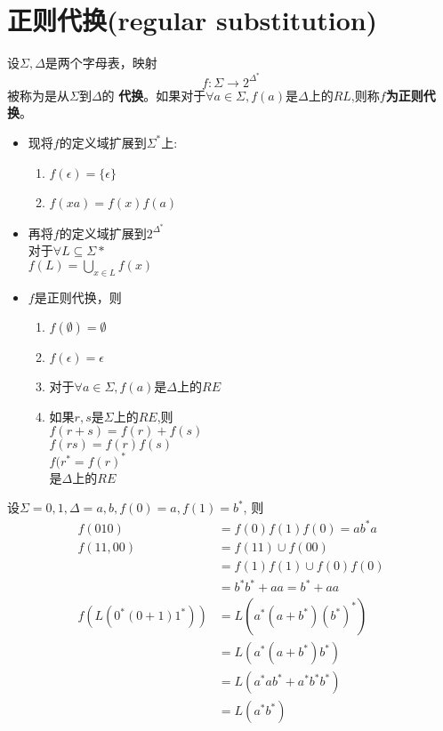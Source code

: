 \section{正则代换(regular substitution)}

设$\Sigma,\Delta$是两个字母表，映射
$$f:\Sigma \to 2^{\Delta^{\ast}}$$
被称为是从$\Sigma$到$\Delta$的
\textbf{代换}。如果对于$\forall a\in \Sigma,f(a)$是$\Delta$上的$RL$,则称\textbf{$f$为正则代换}。

\begin{itemize}
	\item 现将$f$的定义域扩展到$\Sigma^{\ast}$上:
	\begin{enumerate}
		\item $f(\epsilon) =\{\epsilon\}$
		\item $f(xa)=f(x)f(a)$
	\end{enumerate}
    \item 再将$f$的定义域扩展到$2^{\Delta^{\ast}}$\\
    对于$\forall L\subseteq \Sigma{\ast}$\\
    $f(L) = \bigcup\limits_{x\in L} f(x)$
    \item $f$是正则代换，则
    \begin{enumerate}
    	\item $f(\emptyset)=\emptyset$
    	\item $f(\epsilon)=\epsilon$
    	\item 对于$\forall a\in \Sigma,f(a)$是$\Delta$上的$RE$
    	\item 如果$r,s$是$\Sigma$上的$RE$,则\\
    	$f(r+s)=f(r)+f(s)$\\
    	$f(rs)=f(r)f(s)$\\
    	$f(r^{\ast}={f(r)}^{\ast}$\\
    	是$\Delta$上的$RE$
    \end{enumerate}
\end{itemize}

\begin{example}
	设$\Sigma={0,1},\Delta={a,b},f(0)=a,f(1)=b^{\ast}$, 则
	\begin{align*}
		f(010) &= f(0)f(1)f(0)=ab^{\ast}a\\
		f({11,00})&=f(11)\cup f(00) \\
		          &=f(1)f(1)\cup f(0)f(0)\\
		          &=b^{\ast}b^{\ast}+aa = b^{\ast}+aa \\
		f(L(0^{\ast}(0+1)1^{\ast})) &= L(a^{\ast}(a+b^{\ast}){(b^{\ast})}^{\ast})\\
		&= L(a^{\ast}(a+b^{\ast})b^{\ast})\\
		&= L(a^{\ast}ab^{\ast} + a^{\ast}b^{\ast}b^{\ast})\\
		&= L(a^{\ast}b^{\ast})
	\end{align*}
\end{example}

